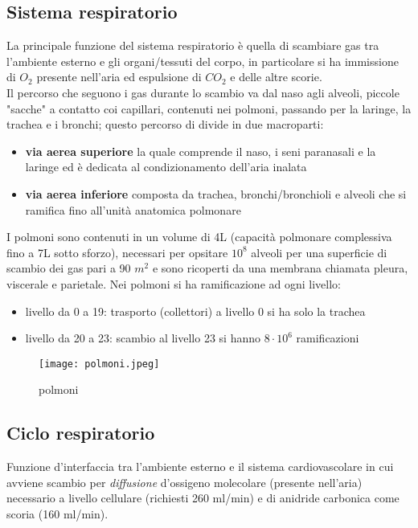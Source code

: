 \documentclass[10pt]{article}
\begin{document}
\subsection{Sistema respiratorio}
La principale funzione del sistema respiratorio è quella di scambiare gas tra l'ambiente esterno e gli organi/tessuti del corpo, in particolare si ha immissione di $O_2$ presente nell'aria ed espulsione di $CO_2$ e delle altre scorie.\\
Il percorso che seguono i gas durante lo scambio va dal naso agli alveoli, piccole "sacche" a contatto coi capillari, contenuti nei polmoni, passando per la laringe, la trachea e i bronchi; questo percorso di divide in due macroparti:
\begin{itemize}
    \item \textbf{via aerea superiore} \textrightarrow la quale comprende il naso, i seni paranasali e la laringe ed è dedicata al condizionamento dell'aria inalata
    \item \textbf{via aerea inferiore} composta da trachea, bronchi/bronchioli e alveoli che si ramifica fino all'unità anatomica polmonare
\end{itemize}

I polmoni sono contenuti in un volume di 4L (capacità polmonare complessiva fino a 7L sotto sforzo), necessari per opsitare $10^8$ alveoli per una superficie di scambio dei gas pari a 90 $m^2$ e sono ricoperti da una membrana chiamata pleura, viscerale e parietale. Nei polmoni si ha ramificazione ad ogni livello:
\begin{itemize}
    \item livello da 0 a 19: trasporto (collettori) \textrightarrow a livello 0 si ha solo la trachea
    \item livello da 20 a 23: scambio \textrightarrow al livello 23 si hanno $8 \cdot 10^6$ ramificazioni
\end{itemize}
\begin{figure}[h!]
\centering
\texttt{[image: polmoni.jpeg]}
\caption{polmoni}
\label{fig:polmoni}
\end{figure}

\subsection{Ciclo respiratorio}
Funzione d'interfaccia tra l'ambiente esterno e  il sistema cardiovascolare in cui avviene scambio per \textit{diffusione} d'ossigeno molecolare (presente nell'aria) necessario a livello cellulare (richiesti 260 ml/min) e di anidride carbonica come scoria (160 ml/min).
\end{document}
